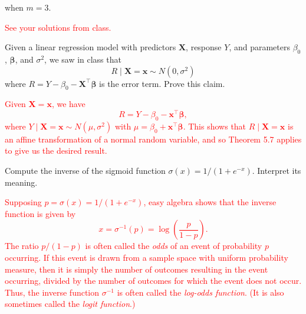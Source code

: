 \documentclass[12pt,reqno]{amsart}
\begin{document}
when $m=3$.

\bigskip
\textcolor{red}{See your solutions from class.}
\bigskip













\prob Given a linear regression model with predictors $\mathbf{X}$, response $Y$, and parameters $\beta_0$, $\boldsymbol{\beta}$, and $\sigma^2$, we saw in class that
	\[ R \mid \mathbf{X} = \mathbf{x} \sim N(0, \sigma^2)
	\]
where $R = Y - \beta_0 - \mathbf{X}^\intercal \boldsymbol{\beta}$ is the error term. Prove this claim.

\bigskip
\textcolor{red}{Given $\mathbf{X} = \mathbf{x}$, we have
	\[R = Y - \beta_0 - \mathbf{x}^\intercal \boldsymbol{\beta},
	\]
where $Y \mid \mathbf{X} = \mathbf{x} \sim N(\mu,\sigma^2)$ with $\mu = \beta_0 + \mathbf{x}^\intercal \boldsymbol{\beta}$. This shows that $R \mid \mathbf{X} = \mathbf{x}$ is an affine transformation of a normal random variable, and so Theorem 5.7 applies to give us the desired result.}
\bigskip










\prob Compute the inverse of the sigmoid function $\sigma(x) = 1/(1+e^{-x})$. Interpret its meaning.

\bigskip
\textcolor{red}{Supposing $p = \sigma(x) = 1 / (1+e^{-x})$, easy algebra shows that the inverse function is given by
	\[x = \sigma^{-1}(p) = \log\left( \frac{p}{1-p} \right).
	\]
The ratio $p/(1-p)$ is often called the \textit{odds} of an event of probability $p$ occurring. If this event is drawn from a sample space with uniform probability measure, then it is simply the number of outcomes resulting in the event occurring, divided by the number of outcomes for which the event does not occur. Thus, the inverse function $\sigma^{-1}$ is often called the \textit{log-odds function}. (It is also sometimes called the \textit{logit function}.)}
\bigskip
\end{document}
